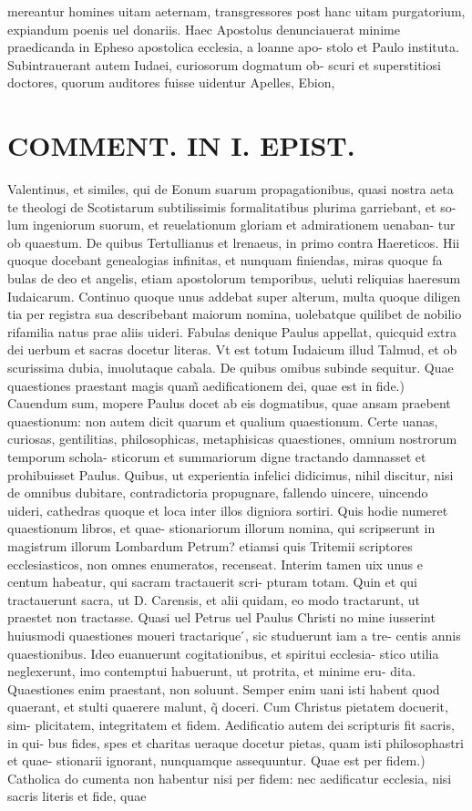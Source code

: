 \documentclass{article}
\begin{document}
\begin{pages}
mereantur homines uitam aeternam, transgressores post hanc uitam purgatorium, expiandum poenis uel donariis. Haec Apostolus denunciauerat minime praedicanda in Epheso apostolica ecclesia, a loanne apo- stolo et Paulo instituta. Subintrauerant autem Iudaei, curiosorum dogmatum ob- scuri et superstitiosi doctores, quorum auditores fuisse uidentur Apelles, Ebion,  \pend
\section*{COMMENT. IN I. EPIST. }
\marginpar{[ p.468 ]}\pstart Valentinus, et similes, qui de Eonum suarum propagationibus, quasi nostra aeta te theologi de Scotistarum subtilissimis formalitatibus plurima garriebant, et so- lum ingeniorum suorum, et reuelationum gloriam et admirationem uenaban- tur ob quaestum. De quibus Tertullianus et lrenaeus, in primo contra Haereticos. Hii quoque docebant genealogias infinitas, et nunquam finiendas, miras quoque fa bulas de deo et angelis, etiam apostolorum temporibus, ueluti reliquias haeresum Iudaicarum. Continuo quoque unus addebat super alterum, multa quoque diligen tia per registra sua describebant maiorum nomina, uolebatque quilibet de nobilio rifamilia natus prae aliis uideri. Fabulas denique Paulus appellat, quicquid extra dei uerbum et sacras docetur literas. Vt est totum Iudaicum illud Talmud, et ob scurissima dubia, inuolutaque cabala. De quibus omibus subinde sequitur. Quae quaestiones praestant magis quam̃ aedificationem dei, quae est in fide.) Cauendum sum, mopere Paulus docet ab eis dogmatibus, quae ansam praebent quaestionum: non autem dicit quarum et qualium quaestionum. Certe uanas, curiosas, gentilitias, philosophicas, metaphisicas quaestiones, omnium nostrorum temporum schola- sticorum et summariorum digne tractando damnasset et prohibuisset Paulus. Quibus, ut experientia infelici didicimus, nihil discitur, nisi de omnibus dubitare, contradictoria propugnare, fallendo uincere, uincendo uideri, cathedras quoque  et loca inter illos digniora sortiri. Quis hodie numeret quaestionum libros, et quae- stionariorum illorum nomina, qui scripserunt in magistrum illorum Lombardum Petrum? etiamsi quis Tritemii scriptores ecclesiasticos, non omnes enumeratos, recenseat. Interim tamen uix unus e centum habeatur, qui sacram tractauerit scri- pturam totam. Quin et qui tractauerunt sacra, ut D. Carensis, et alii quidam, eo modo tractarunt, ut praestet non tractasse. Quasi uel Petrus uel Paulus Christi no mine iusserint huiusmodi quaestiones moueri tractarique ́, sic studuerunt iam a tre- centis annis quaestionibus. Ideo euanuerunt cogitationibus, et spiritui ecclesia- stico utilia neglexerunt, imo contemptui habuerunt, ut protrita, et minime eru- dita. Quaestiones enim praestant, non soluunt. Semper enim uani isti habent quod quaerant, et stulti quaerere malunt, q̃ doceri. Cum Christus pietatem docuerit, sim- plicitatem, integritatem et fidem. Aedificatio autem dei scripturis fit sacris, in qui- bus fides, spes et charitas ueraque docetur pietas, quam isti philosophastri et quae- stionarii ignorant, nunquamque assequuntur. Quae est per fidem.) Catholica do cumenta non habentur nisi per fidem: nec aedificatur ecclesia, nisi sacris literis et fide, quae 
\end{pages}
\end{document}
